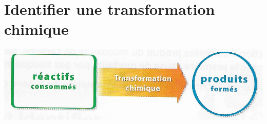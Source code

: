 \documentclass[12pt,a4paper]{article}
\begin{document}
	
	

\section{Identifier une transformation chimique}






\begin{center}
	\includegraphics[scale=0.5]{img/transfo}
\end{center}


\end{document}
